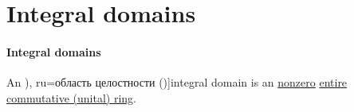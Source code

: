 \section{Integral domains}\label{sec:integral_domains}

\paragraph{Integral domains}

\begin{definition}\label{def:integral_domain}
  An \term[bg=област на цялостност (\cite[393]{Обрешков1962ВисшаАлгебра}), ru=область целостности (\cite[def. 3.5.1]{Винберг2014КурсАлгебры})]{integral domain} is an \hyperref[def:ring/trivial]{nonzero} \hyperref[def:entire_semiring]{entire} \hyperref[def:ring/commutative]{commutative (unital) ring}.
\end{definition}

